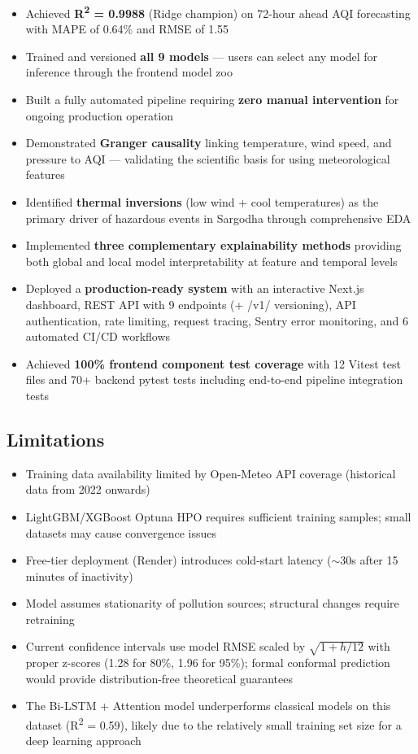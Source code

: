 \documentclass[12pt, a4paper, oneside]{article}
\begin{document}
\begin{itemize}
    \item Achieved \textbf{R\textsuperscript{2} = 0.9988} (Ridge champion) on 72-hour ahead AQI forecasting with MAPE of 0.64\% and RMSE of 1.55
    \item Trained and versioned \textbf{all 9 models} --- users can select any model for inference through the frontend model zoo
    \item Built a fully automated pipeline requiring \textbf{zero manual intervention} for ongoing production operation
    \item Demonstrated \textbf{Granger causality} linking temperature, wind speed, and pressure to AQI --- validating the scientific basis for using meteorological features
    \item Identified \textbf{thermal inversions} (low wind + cool temperatures) as the primary driver of hazardous events in Sargodha through comprehensive EDA
    \item Implemented \textbf{three complementary explainability methods} providing both global and local model interpretability at feature and temporal levels
    \item Deployed a \textbf{production-ready system} with an interactive Next.js dashboard, REST API with 9 endpoints (+ /v1/ versioning), API authentication, rate limiting, request tracing, Sentry error monitoring, and 6 automated CI/CD workflows
    \item Achieved \textbf{100\% frontend component test coverage} with 12 Vitest test files and 70+ backend pytest tests including end-to-end pipeline integration tests
\end{itemize}

\subsection{Limitations}

\begin{itemize}
    \item Training data availability limited by Open-Meteo API coverage (historical data from 2022 onwards)
    \item LightGBM/XGBoost Optuna HPO requires sufficient training samples; small datasets may cause convergence issues
    \item Free-tier deployment (Render) introduces cold-start latency ($\sim$30s after 15 minutes of inactivity)
    \item Model assumes stationarity of pollution sources; structural changes require retraining
    \item Current confidence intervals use model RMSE scaled by $\sqrt{1+h/12}$ with proper z-scores (1.28 for 80\%, 1.96 for 95\%); formal conformal prediction would provide distribution-free theoretical guarantees
    \item The Bi-LSTM + Attention model underperforms classical models on this dataset (R\textsuperscript{2} = 0.59), likely due to the relatively small training set size for a deep learning approach
\end{itemize}
\end{document}
